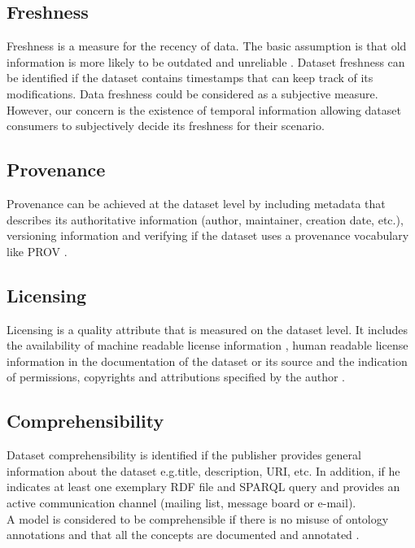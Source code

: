 \documentclass[onecolumn, crcready]{iosart2c}
\begin{document}
\subsection{Freshness}

Freshness is a measure for the recency of data. The basic assumption is that old information is more likely to be outdated and unreliable \cite{Flouris2012}. Dataset freshness can be identified if the dataset contains timestamps that can keep track of its modifications. Data freshness could be considered as a subjective measure. However, our concern is the existence of temporal information allowing dataset consumers to subjectively decide its freshness for their scenario.

\subsection{Provenance}

Provenance can be achieved at the dataset level by including metadata that describes its authoritative information (author, maintainer, creation date, etc.), versioning information and verifying if the dataset uses a provenance vocabulary like PROV \cite{w3c-prov-o}.\\

\subsection{Licensing}

Licensing is a quality attribute that is measured on the dataset level. It includes the availability of machine readable license information \cite{Hogan:2012:ESL:2263498.2264570}, human readable license information in the documentation of the dataset or its source \cite{Hogan:2012:ESL:2263498.2264570} and the indication of permissions, copyrights and attributions specified by the author \cite{Framework2012}.

\subsection{Comprehensibility}

Dataset comprehensibility is identified if the publisher provides general information about the dataset e.g.title, description, URI, etc. In addition, if he indicates at least one exemplary RDF file and SPARQL query and provides an active communication channel (mailing list, message board or e-mail)\cite{flemming2010}.\\ A model is considered to be comprehensible if there is no misuse of ontology annotations and that all the concepts are documented and annotated \cite{Mader2012}\cite{DBLP:conf/ic3k/KeetSP13}.
\end{document}
